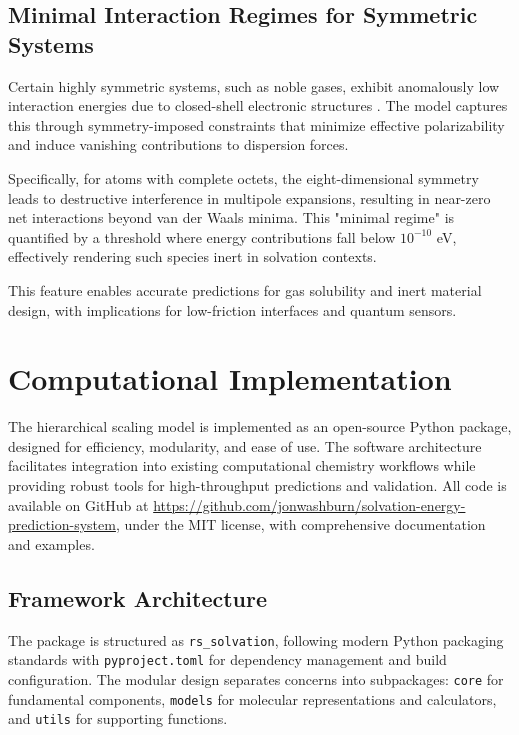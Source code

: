 \documentclass[twocolumn,prd,amsmath,amssymb,aps,superscriptaddress,nofootinbib]{revtex4-2}
\begin{document}
\subsection{Minimal Interaction Regimes for Symmetric Systems}

Certain highly symmetric systems, such as noble gases, exhibit anomalously low interaction energies due to closed-shell electronic structures \cite{Kaplan2006}. The model captures this through symmetry-imposed constraints that minimize effective polarizability and induce vanishing contributions to dispersion forces.

Specifically, for atoms with complete octets, the eight-dimensional symmetry leads to destructive interference in multipole expansions, resulting in near-zero net interactions beyond van der Waals minima. This "minimal regime" is quantified by a threshold where energy contributions fall below $10^{-10}$ eV, effectively rendering such species inert in solvation contexts.

This feature enables accurate predictions for gas solubility and inert material design, with implications for low-friction interfaces and quantum sensors.

\section{Computational Implementation}

The hierarchical scaling model is implemented as an open-source Python package, designed for efficiency, modularity, and ease of use. The software architecture facilitates integration into existing computational chemistry workflows while providing robust tools for high-throughput predictions and validation. All code is available on GitHub at \url{https://github.com/jonwashburn/solvation-energy-prediction-system}, under the MIT license, with comprehensive documentation and examples.

\subsection{Framework Architecture}

The package is structured as \texttt{rs\_solvation}, following modern Python packaging standards with \texttt{pyproject.toml} for dependency management and build configuration. The modular design separates concerns into subpackages: \texttt{core} for fundamental components, \texttt{models} for molecular representations and calculators, and \texttt{utils} for supporting functions.
\end{document}
